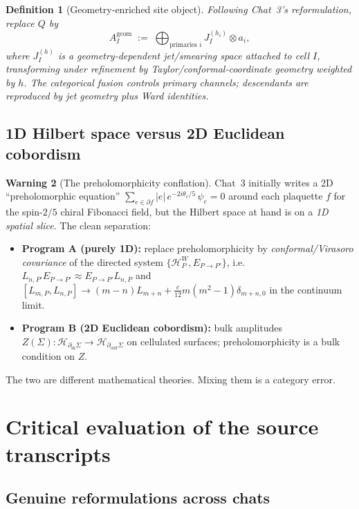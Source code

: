 \documentclass[11pt,a4paper]{article}
\newtheorem{definition}{Definition}[section]
\theoremstyle{definition}
\newtheorem{warning}[definition]{Warning}
\newcommand{\Hh}{\mathcal{H}}
\begin{document}
\begin{definition}[Geometry-enriched site object]\label{def:Ageom}
Following Chat~3's reformulation, replace $Q$ by
\[
A_I^{\mathrm{geom}} \;:=\; \bigoplus_{\text{primaries } i} J_I^{(h_i)} \otimes a_i,
\]
where $J_I^{(h)}$ is a geometry-dependent jet/smearing space attached to
cell $I$, transforming under refinement by Taylor/conformal-coordinate
geometry weighted by $h$. The categorical fusion controls primary channels;
descendants are reproduced by jet geometry plus Ward identities.
\end{definition}

\subsection{1D Hilbert space versus 2D Euclidean cobordism}

\begin{warning}[The preholomorphicity conflation]\label{warn:preholo}
Chat~3 initially writes a 2D ``preholomorphic equation''
$\sum_{e\in\partial f} |e|\,e^{-2i\theta_e/5}\,\psi_e = 0$ around each
plaquette $f$ for the spin-$2/5$ chiral Fibonacci field, but the Hilbert
space at hand is on a \emph{1D spatial slice}. The clean separation:
\begin{itemize}
\item \textbf{Program A (purely 1D):} replace preholomorphicity by
\emph{conformal/Virasoro covariance} of the directed system
$\{\Hh_P^W, E_{P\to P'}\}$, i.e.\
$L_{n,P'}E_{P\to P'} \approx E_{P\to P'}L_{n,P}$ and
$[L_{m,P},L_{n,P}]\to (m-n)L_{m+n}+\tfrac{c}{12}m(m^{2}-1)\delta_{m+n,0}$ in
the continuum limit.
\item \textbf{Program B (2D Euclidean cobordism):} bulk amplitudes
$Z(\Sigma):\Hh_{\partial_{\mathrm{in}}\Sigma}\to\Hh_{\partial_{\mathrm{out}}\Sigma}$
on cellulated surfaces; preholomorphicity is a bulk condition on $Z$.
\end{itemize}
The two are different mathematical theories. Mixing them is a category
error.
\end{warning}

\section{Critical evaluation of the source transcripts}\label{sec:critique}

\subsection{Genuine reformulations across chats}
\end{document}
